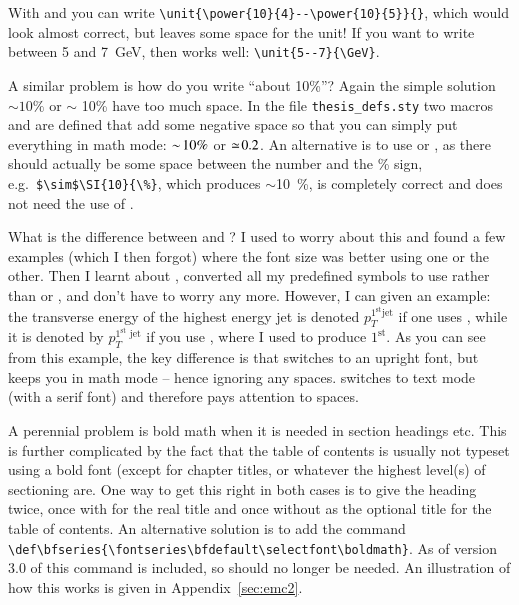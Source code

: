With  and  you can write
\verb+\unit{\power{10}{4}--\power{10}{5}}{}+, which would look almost
correct, but leaves some space for the unit! If you want to write
between 5 and \SI{7}{\GeV}, then  works well:
\verb+\unit{5--7}{\GeV}+.

A similar problem is how do you write \enquote{about 10\%}?  Again the
simple solution $\sim 10\%$ or $\sim$ 10\% have too much space. In the
file \texttt{thesis\_defs.sty} two macros  and
 are defined that add some negative space so that you
can simply put everything in math mode: $\sim\! 10\%$ or $\simeq\!
0.2$. An alternative is to use  or , as there
should actually be some space between the number and the \% sign,
e.g.\ \verb+$\sim$\SI{10}{\%}+, which produces $\sim$\SI{10}{\%}, is
completely correct and does not need the use of .

What is the difference between  and
? I used to worry about this and found a
few examples (which I then forgot) where the font size was better
using one or the other. Then I learnt about ,
converted all my predefined symbols to use  rather than
 or , and don't have to worry any
more. However, I can given an example: the transverse energy of the
highest energy jet is denoted $p_{T}^{\mathrm{1^{\text{st}} jet}}$ if
one uses , while it is denoted by
$p_{T}^{\textrm{1$^{\text{st}}$ jet}}$ if you use ,
where I used  to produce $1^{\text{st}}$.  As you can see
from this example, the key difference is that  switches
to an upright font, but keeps you in math mode -- hence ignoring any
spaces.  switches to text mode (with a serif font) and
therefore pays attention to spaces.

A perennial problem is bold math when it is needed in
section headings etc. This is further complicated by the fact that the
table of contents is usually not typeset using a bold font (except for
chapter titles, or whatever the highest level(s) of sectioning are.
One way to get this right in both cases is to give the
heading twice, once with  for the real title and once
without as the optional title for the table of contents.
An alternative solution is to add the command\\
\verb|\def\bfseries{\fontseries\bfdefault\selectfont\boldmath}|.
As of version 3.0 of  this command is included,
so  should no longer be needed.
An illustration of how this works is given in Appendix~\ref{sec:emc2}.


